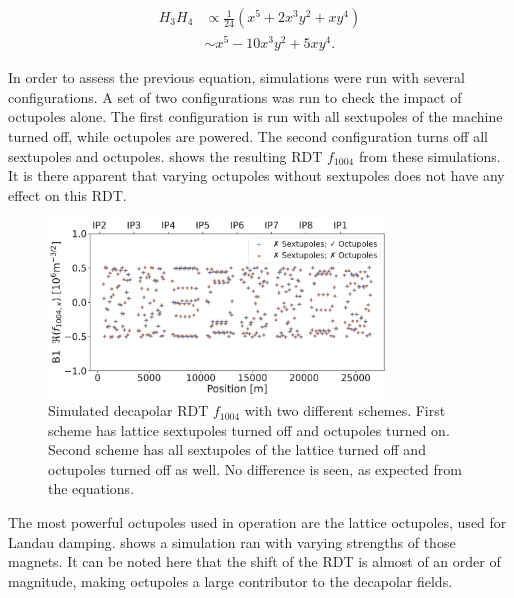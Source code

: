 \begin{equation}
    \begin{aligned}
         H_3 H_4 &\propto \frac{1}{24} \left(x^5 + 2x^3y^2 + xy^4 \right)\\
                   &\sim    x^5 - 10x^3y^2 + 5xy^4.
    \end{aligned}
    \label{eq:decapoles:sextupole_octupole_b5}
\end{equation}

In order to assess the previous equation, simulations were run with several configurations.  A set
of two configurations was run to check the impact of octupoles alone. The first configuration is run
with all sextupoles of the machine turned off, while octupoles are powered. The second configuration
turns off all sextupoles and octupoles.  shows
the resulting RDT $f_{1004}$ from these simulations. It is there apparent that varying octupoles
without sextupoles does not have any effect on this RDT.

\begin{figure}[!htb]
    \centering
    \includegraphics[width=0.8\textwidth]{./images/f1004/f1004_no_ms.pdf}
    \caption{Simulated decapolar RDT $f_{1004}$ with two different schemes. First scheme has
    lattice sextupoles turned off and octupoles turned on. Second scheme has all sextupoles of the
    lattice turned off and octupoles turned off as well. No difference is seen, as expected from
    the equations.}
    \label{fig:decapoles:rdts:sectupole_octupole_no_diff}
\end{figure}

The most powerful octupoles used in operation are the lattice octupoles, used for Landau damping.
 shows a simulation ran with varying strengths of
those magnets. It can be noted here that the shift of the RDT is almost of an order of magnitude,
making octupoles a large contributor to the decapolar fields.

